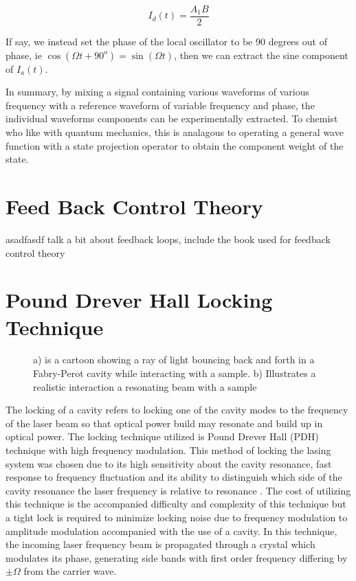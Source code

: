 \documentclass[11pt,a4paper]{book}
\newcommand{\imginput}[1]{} %
\begin{document}
			\begin{equation}
				I_d(t) = \dfrac{A_1 B}{2}
			\end{equation}	
		
			If say, we instead set the phase of the local oscillator to be 90 degrees out of phase, ie $\cos(\Omega t + 90^o)=\sin(\Omega t)$, then we can extract the sine component of $I_a(t)$.
			
			In summary, by mixing a signal containing various waveforms of various frequency with a reference waveform of variable frequency and phase, the individual waveforms components can be experimentally extracted. To chemist who like with quantum mechanics, this is analagous to operating a general wave function with a state projection operator to obtain the component weight of the state.

	\section{Feed Back Control Theory}
		\label{sec:Feed Back Control Theory}
		asadfasdf talk a bit about feedback loops, include the book used for feedback control theory

	\section{Pound Drever Hall Locking Technique}
		\label{sec:Pound Drever Hall Locking Technique}
		
		\begin{figure} [!ht]
			\centering
			\def\svgwidth{\columnwidth}
			\resizebox{160mm}{!}{\imginput{images/PDH-setup.pdf_tex}}
			\label{fig:PDHSetup}
			\caption{a) is a cartoon showing a ray of light bouncing back and forth in a Fabry-Perot cavity while interacting with a sample. b) Illustrates a realistic interaction a resonating beam with a sample }
		\end{figure}
		
		The locking of a cavity refers to locking one of the cavity modes to the frequency of the laser beam so that optical power build may resonate and build up in optical power.
		The locking technique utilized is Pound Drever Hall (PDH) technique with high frequency modulation. This method of locking the lasing system was chosen due to its high sensitivity about the cavity resonance, fast response to frequency fluctuation and its ability to distinguish which side of the cavity resonance the laser frequency is relative to resonance \cite{PDH Intro}. The cost of utilizing this technique is the accompanied difficulty and complexity of this technique but a tight lock is required to minimize locking noise due to frequency modulation to amplitude modulation accompanied with the use of a cavity. In this technique, the incoming laser frequency beam is propagated through a crystal which modulates its phase, generating side bands with first order frequency differing by $\pm \Omega$ from the carrier wave.
		
\end{document}
